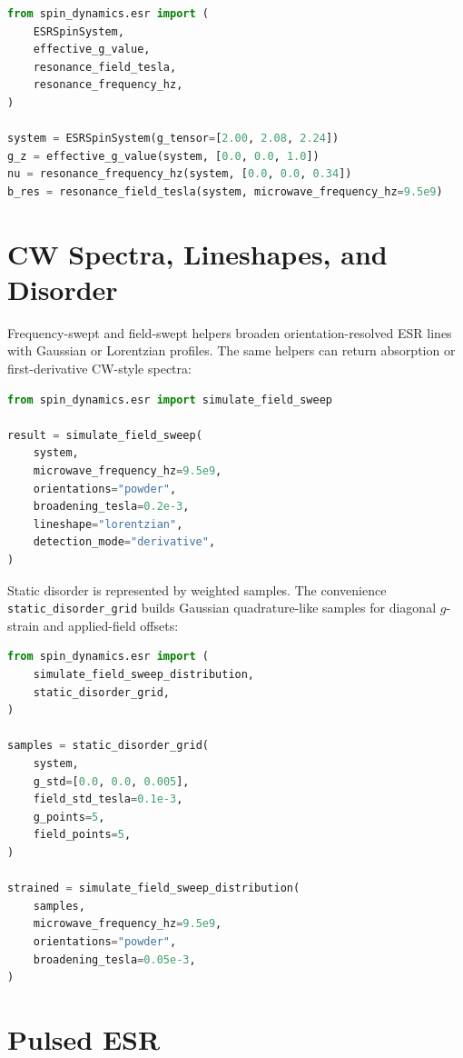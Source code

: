 \documentclass[11pt,oneside]{report}
\newcommand{\code}[1]{\texttt{#1}}
\begin{document}
\begin{lstlisting}[language=Python]
from spin_dynamics.esr import (
    ESRSpinSystem,
    effective_g_value,
    resonance_field_tesla,
    resonance_frequency_hz,
)

system = ESRSpinSystem(g_tensor=[2.00, 2.08, 2.24])
g_z = effective_g_value(system, [0.0, 0.0, 1.0])
nu = resonance_frequency_hz(system, [0.0, 0.0, 0.34])
b_res = resonance_field_tesla(system, microwave_frequency_hz=9.5e9)
\end{lstlisting}

\section{CW Spectra, Lineshapes, and Disorder}

Frequency-swept and field-swept helpers broaden orientation-resolved ESR lines
with Gaussian or Lorentzian profiles. The same helpers can return absorption
or first-derivative CW-style spectra:

\begin{lstlisting}[language=Python]
from spin_dynamics.esr import simulate_field_sweep

result = simulate_field_sweep(
    system,
    microwave_frequency_hz=9.5e9,
    orientations="powder",
    broadening_tesla=0.2e-3,
    lineshape="lorentzian",
    detection_mode="derivative",
)
\end{lstlisting}

Static disorder is represented by weighted samples. The convenience
\code{static\_disorder\_grid} builds Gaussian quadrature-like samples for
diagonal \(g\)-strain and applied-field offsets:

\begin{lstlisting}[language=Python]
from spin_dynamics.esr import (
    simulate_field_sweep_distribution,
    static_disorder_grid,
)

samples = static_disorder_grid(
    system,
    g_std=[0.0, 0.0, 0.005],
    field_std_tesla=0.1e-3,
    g_points=5,
    field_points=5,
)

strained = simulate_field_sweep_distribution(
    samples,
    microwave_frequency_hz=9.5e9,
    orientations="powder",
    broadening_tesla=0.05e-3,
)
\end{lstlisting}

\section{Pulsed ESR}
\end{document}
